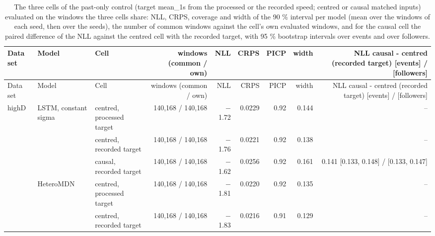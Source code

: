 \begingroup
\footnotesize
\begin{longtable}{lllrrrrrr}
\caption{The three cells of the past-only control (target mean\_1s from the processed or the recorded speed; centred or causal matched inputs) evaluated on the windows the three cells share: NLL, CRPS, coverage and width of the 90 \% interval per model (mean over the windows of each seed, then over the seeds), the number of common windows against the cell's own evaluated windows, and for the causal cell the paired difference of the NLL against the centred cell with the recorded target, with 95 \% bootstrap intervals over events and over followers.}\label{tab:t1-common-support--cells--mean-1s} \\
\toprule
Data set & Model & Cell & windows (common / own) & NLL & CRPS & PICP & width & NLL causal - centred (recorded target) [events] / [followers] \\
\midrule
\endfirsthead
\toprule
Data set & Model & Cell & windows (common / own) & NLL & CRPS & PICP & width & NLL causal - centred (recorded target) [events] / [followers] \\
\midrule
\endhead
\bottomrule
\endlastfoot
highD & LSTM, constant sigma & centred, processed target & 140,168 / 140,168 & $-$1.72 & 0.0229 & 0.92 & 0.144 & -- \\
 &  & centred, recorded target & 140,168 / 140,168 & $-$1.76 & 0.0221 & 0.92 & 0.138 & -- \\
 &  & causal, recorded target & 140,168 / 140,168 & $-$1.62 & 0.0256 & 0.92 & 0.161 & 0.141 [0.133, 0.148] / [0.133, 0.147] \\
\midrule
 & HeteroMDN & centred, processed target & 140,168 / 140,168 & $-$1.81 & 0.0220 & 0.92 & 0.135 & -- \\
 &  & centred, recorded target & 140,168 / 140,168 & $-$1.83 & 0.0216 & 0.91 & 0.129 & -- \\

\end{longtable}
